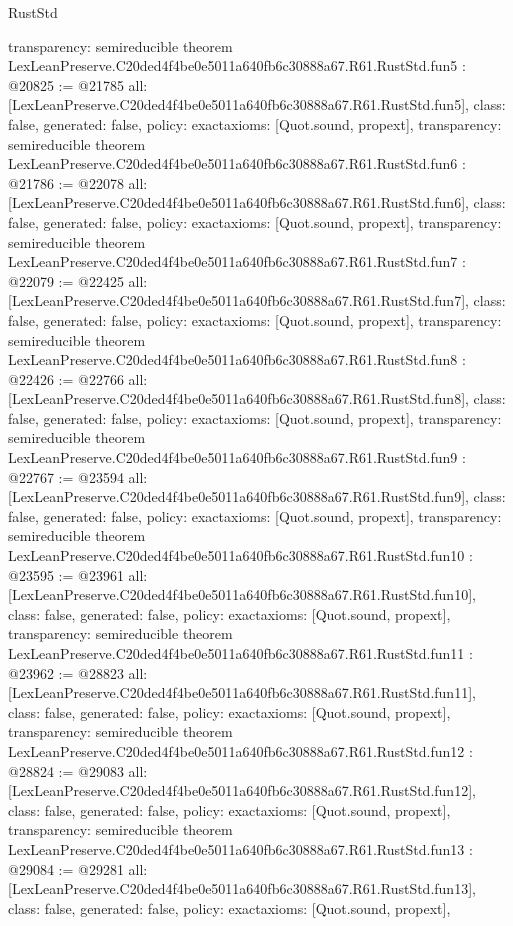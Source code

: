 \begin{lexlean}{RustStd}
\begin{coremodule}
{  transparency: semireducible
}
theorem LexLeanPreserve.C20ded4f4be0e5011a640fb6c30888a67.R61.RustStd.fun5 : @20825 := @21785 {
  all: [LexLeanPreserve.C20ded4f4be0e5011a640fb6c30888a67.R61.RustStd.fun5],
  class: false,
  generated: false,
  policy: exact{axioms: [Quot.sound, propext]},
  transparency: semireducible
}
theorem LexLeanPreserve.C20ded4f4be0e5011a640fb6c30888a67.R61.RustStd.fun6 : @21786 := @22078 {
  all: [LexLeanPreserve.C20ded4f4be0e5011a640fb6c30888a67.R61.RustStd.fun6],
  class: false,
  generated: false,
  policy: exact{axioms: [Quot.sound, propext]},
  transparency: semireducible
}
theorem LexLeanPreserve.C20ded4f4be0e5011a640fb6c30888a67.R61.RustStd.fun7 : @22079 := @22425 {
  all: [LexLeanPreserve.C20ded4f4be0e5011a640fb6c30888a67.R61.RustStd.fun7],
  class: false,
  generated: false,
  policy: exact{axioms: [Quot.sound, propext]},
  transparency: semireducible
}
theorem LexLeanPreserve.C20ded4f4be0e5011a640fb6c30888a67.R61.RustStd.fun8 : @22426 := @22766 {
  all: [LexLeanPreserve.C20ded4f4be0e5011a640fb6c30888a67.R61.RustStd.fun8],
  class: false,
  generated: false,
  policy: exact{axioms: [Quot.sound, propext]},
  transparency: semireducible
}
theorem LexLeanPreserve.C20ded4f4be0e5011a640fb6c30888a67.R61.RustStd.fun9 : @22767 := @23594 {
  all: [LexLeanPreserve.C20ded4f4be0e5011a640fb6c30888a67.R61.RustStd.fun9],
  class: false,
  generated: false,
  policy: exact{axioms: [Quot.sound, propext]},
  transparency: semireducible
}
theorem LexLeanPreserve.C20ded4f4be0e5011a640fb6c30888a67.R61.RustStd.fun10 : @23595 := @23961 {
  all: [LexLeanPreserve.C20ded4f4be0e5011a640fb6c30888a67.R61.RustStd.fun10],
  class: false,
  generated: false,
  policy: exact{axioms: [Quot.sound, propext]},
  transparency: semireducible
}
theorem LexLeanPreserve.C20ded4f4be0e5011a640fb6c30888a67.R61.RustStd.fun11 : @23962 := @28823 {
  all: [LexLeanPreserve.C20ded4f4be0e5011a640fb6c30888a67.R61.RustStd.fun11],
  class: false,
  generated: false,
  policy: exact{axioms: [Quot.sound, propext]},
  transparency: semireducible
}
theorem LexLeanPreserve.C20ded4f4be0e5011a640fb6c30888a67.R61.RustStd.fun12 : @28824 := @29083 {
  all: [LexLeanPreserve.C20ded4f4be0e5011a640fb6c30888a67.R61.RustStd.fun12],
  class: false,
  generated: false,
  policy: exact{axioms: [Quot.sound, propext]},
  transparency: semireducible
}
theorem LexLeanPreserve.C20ded4f4be0e5011a640fb6c30888a67.R61.RustStd.fun13 : @29084 := @29281 {
  all: [LexLeanPreserve.C20ded4f4be0e5011a640fb6c30888a67.R61.RustStd.fun13],
  class: false,
  generated: false,
  policy: exact{axioms: [Quot.sound, propext]},
}
\end{coremodule}
\end{lexlean}
